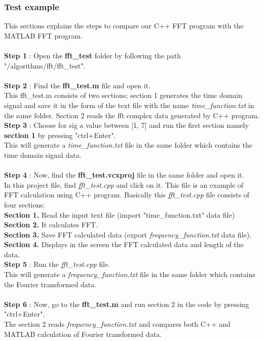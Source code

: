 \begin{refsection}
\subsubsection{Test example}
This sections explains the steps to compare our C++ FFT program with the MATLAB FFT program.\\ \\
\textbf{Step 1} : Open the \textbf{fft\_test} folder by following the path "/algorithms/fft/fft\_test".\\ \\
\textbf{Step 2} : Find the \textbf{fft\_test.m} file and open it.\\
This fft\_test.m consists of two sections; section 1 generates the time domain signal and save it in the form of the text file with the name \textit{time\_function.txt} in the same folder. Section 2 reads the fft complex data generated by C++ program.\\

\textbf{Step 3} : Choose for sig a value between [1, 7] and run the first section namely \textbf{section 1} by pressing "ctrl+Enter".\\
This will generate a \textit{time\_function.txt} file in the same folder which contains the time domain signal data.\\ \\
\textbf{Step 4} : Now, find the \textbf{fft\_test.vcxproj} file in the same folder and open it.\\
In this project file, find \textit{fft\_test.cpp} and click on it. This file is an example of FFT calculation using C++ program. Basically this \textit{fft\_test.cpp} file consists of four sections:\\
\textbf{Section 1.} Read the input text file (import "time\_function.txt" data file)\\
\textbf{Section 2.} It calculates FFT.\\
\textbf{Section 3.} Save FFT calculated data (export \textit{frequency\_function.txt} data file).\\
\textbf{Section 4.}  Displays in the screen the FFT calculated data and length of the data.\\

\textbf{Step 5} : Run the \textit{fft\_test.cpp} file.\\
This will generate a \textit{frequency\_function.txt} file in the same folder which contains the Fourier transformed data.\\ \\
\textbf{Step 6} : Now, go to the \textbf{fft\_test.m} and run section 2 in the code by pressing "ctrl+Enter".\\
The section 2 reads \textit{frequency\_function.txt} and compares both C++ and MATLAB calculation of Fourier transformed data.


\end{refsection}
